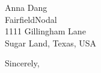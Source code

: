 \documentclass{letter} %
\begin{document}
\begin{letter}{Anna Dang \\
FairfieldNodal \\
1111 Gillingham Lane \\
Sugar Land, Texas, USA}
\closing{Sincerely,} 
 

 

\end{letter}
 
\end{document}
